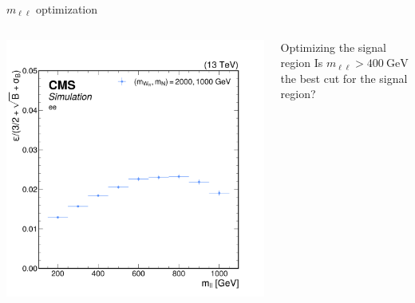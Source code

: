 \documentclass[aspectratio=169]{beamer}
\begin{document}
\begin{frame}{$m_{\ell \ell}$ optimization}
  \begin{columns}
    \begin{column}{0.50\textwidth}
      \centering
      \includegraphics[width=\textwidth]{../figures/plots/mll-optimization.png}
    \end{column}
    \begin{column}{0.50\textwidth}
        \centering
        \resizebox{\columnwidth}{!}{%
        }
      \begin{block}{Optimizing the signal region}
        Is $m_{\ell \ell} > 400 \mathrm{~GeV}$ the best cut for the signal region?
      \end{block}
    \end{column}
  \end{columns}
\end{frame}
\end{document}
